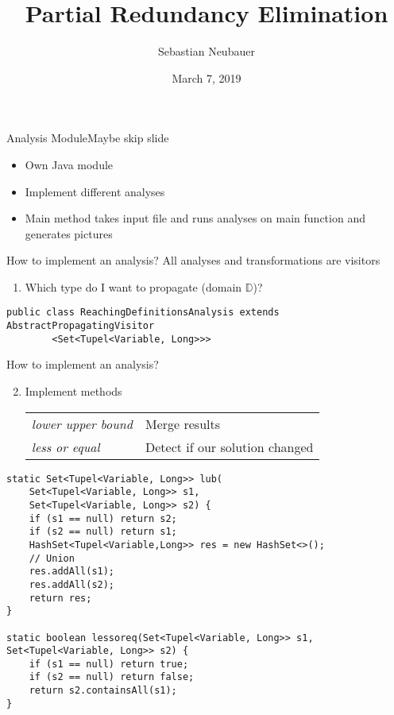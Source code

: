 \documentclass[xcolor={usenames,dvipsnames}, aspectratio=169, 12pt]{beamer}
\title[Program Optimization]{Partial Redundancy Elimination}
\author[S. Neubauer]{Sebastian Neubauer}
\date{March 7, 2019}
\institute{Technische Universität München}
\begin{document}
\frame[plain]{\titlepage}

\begin{frame}{Analysis Module}{Maybe skip slide}
\begin{itemize}
	\item Own Java module
	\item Implement different analyses
	\item Main method takes input file and runs analyses on main function and generates pictures
\end{itemize}
\end{frame}

\begin{frame}[fragile]{How to implement an analysis?}
All analyses and transformations are visitors
\begin{enumerate}
	\item Which type do I want to propagate (domain $\mathbb{D}$)?
\end{enumerate}

\begin{lstlisting}
public class ReachingDefinitionsAnalysis extends AbstractPropagatingVisitor
		<Set<Tupel<Variable, Long>>>
\end{lstlisting}
\end{frame}

\begin{frame}[fragile]{How to implement an analysis?}
\begin{enumerate}
	\setcounter{enumi}{1}
	\item Implement methods\\
	\begin{tabular}{ll}
		\emph{lower upper bound} & Merge results\\
		\emph{less or equal} & Detect if our solution changed\\
	\end{tabular}
\end{enumerate}

\vspace{-0.3cm}
\begin{lstlisting}
static Set<Tupel<Variable, Long>> lub(
	Set<Tupel<Variable, Long>> s1,
	Set<Tupel<Variable, Long>> s2) {
    if (s1 == null) return s2;
    if (s2 == null) return s1;
    HashSet<Tupel<Variable,Long>> res = new HashSet<>();
    // Union
    res.addAll(s1);
    res.addAll(s2);
    return res;
}

static boolean lessoreq(Set<Tupel<Variable, Long>> s1, Set<Tupel<Variable, Long>> s2) {
    if (s1 == null) return true;
    if (s2 == null) return false;
    return s2.containsAll(s1);
}
\end{lstlisting}
\end{frame}
\end{document}
